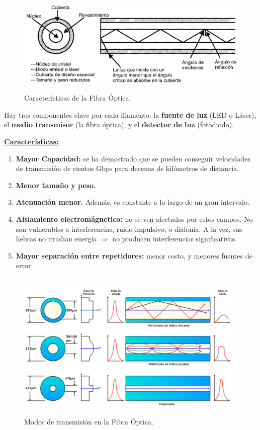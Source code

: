 \documentclass[10pt,a4paper]{article}
\begin{document}
\begin{figure}[ht!]
  \caption{Características de la Fibra Óptica.}
  \label{fig:fibra_optica}  
  \centering
  \hbox{
	\includegraphics[width=\textwidth-\fboxrule-\fboxrule]{imgs/fibra_optica.png}}
\end{figure}

Hay tres componentes clave por cada filamento: la \textbf{fuente de luz} (LED o Láser), el \textbf{medio transmisor} (la fibra óptica), y el \textbf{detector de luz} (fotodiodo).

\underline{\textbf{Características:}}
\begin{enumerate}[+]
\item \textbf{Mayor Capacidad:} se ha demostrado que se pueden conseguir velocidades de transmisión de cientos Gbps para decenas de kilómetros de distancia.
\item \textbf{Menor tamaño y peso.}
\item \textbf{Atenuación menor.} Además, es constante a lo largo de un gran intervalo.
\item \textbf{Aislamiento electromágnetico:} no se ven afectados por estos campos. No son vulnerables a interferencias, ruido impulsivo, o diafonía. A la vez, sus hebras no irradian energía $\Rightarrow$ no producen interferencias significativas.
\item \textbf{Mayor separación entre repetidores:} menor costo, y menores fuentes de error.
\end{enumerate}

\begin{figure}[ht!]
  \caption{Modos de transmisión en la Fibra Óptica.}
  \label{fig:fibra_optica_modos}  
  \centering
  \hbox{
	\includegraphics[width=\textwidth-\fboxrule-\fboxrule]{imgs/fibra_optica_modos.png}}
\end{figure}
\end{document}
